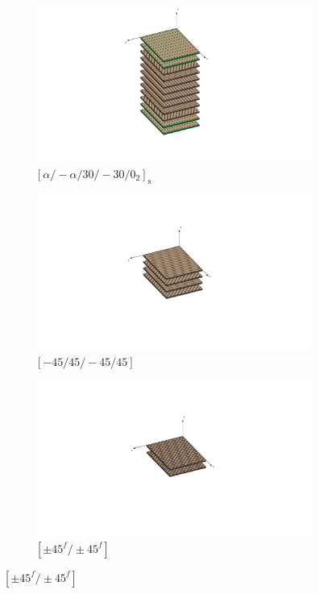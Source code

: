 \documentclass[a4paper,num-refs]{oup-contemporary}
\begin{document}
\begin{figure}[bt!]
	\centering
	\begin{subfigure}[t]{0.24\textwidth}
		\centering
		
		\includegraphics[width=\textwidth]{struct1.pdf}
		\caption{$[\alpha /-\alpha / 30 /-30 / 0_{2}]_{\mathrm{s}}$ }
		
	\end{subfigure}
	\hfill
	\begin{subfigure}[t]{0.24\textwidth}
		\centering
		\includegraphics[width=\textwidth]{struct2.pdf}
		\caption{$[-45 / 45 /-45 / 45]$}
		
	\end{subfigure}
	\hfill
	\begin{subfigure}[t]{0.24\textwidth}
		\centering
		\includegraphics[width=\textwidth]{struct3.pdf}
		\caption{$[\pm 45^{f} / \pm 45^{f}]$}
		

\end{subfigure}
\end{figure}
\end{document}
